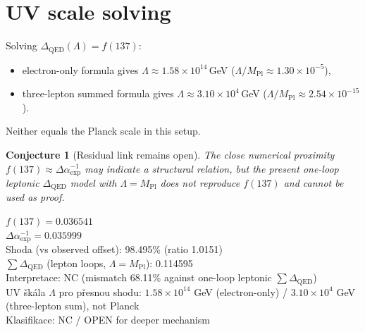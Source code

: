 \documentclass[12pt,a4paper]{article}
\newtheorem{conjecture}{Conjecture}[section]
\begin{document}
\section{UV scale solving}

Solving $\Delta_{\mathrm{QED}}(\Lambda)=f(137)$:
\begin{itemize}
  \item electron-only formula gives
  $\Lambda\approx1.58\times 10^{14}\,$GeV ($\Lambda/M_{\mathrm{Pl}}\approx1.30\times10^{-5}$),
  \item three-lepton summed formula gives
  $\Lambda\approx3.10\times10^{4}\,$GeV ($\Lambda/M_{\mathrm{Pl}}\approx2.54\times10^{-15}$).
\end{itemize}
Neither equals the Planck scale in this setup.

\begin{conjecture}[Residual link remains open]
The close numerical proximity $f(137)\approx\Delta\alpha^{-1}_{\mathrm{exp}}$
may indicate a structural relation, but the present one-loop leptonic
$\Delta_{\mathrm{QED}}$ model with $\Lambda=M_{\mathrm{Pl}}$ does not reproduce
$f(137)$ and cannot be used as proof.
\end{conjecture}

\begin{statusbox}
$f(137)=0.036541$\\
$\Delta\alpha^{-1}_{\mathrm{exp}}=0.035999$\\
Shoda (vs observed offset): 98.495\% (ratio 1.0151)\\
$\sum\Delta_{\mathrm{QED}}$ (lepton loops, $\Lambda=M_{\mathrm{Pl}}$): 0.114595\\
Interpretace: NC (mismatch 68.11\% against one-loop leptonic $\sum\Delta_{\mathrm{QED}}$)\\
UV škála $\Lambda$ pro přesnou shodu: $1.58\times10^{14}$ GeV (electron-only) / $3.10\times10^4$ GeV (three-lepton sum), not Planck\\
Klasifikace: NC / OPEN for deeper mechanism
\end{statusbox}

\ifdefined\INCLUDEMODE
\else
  
\end{document}
